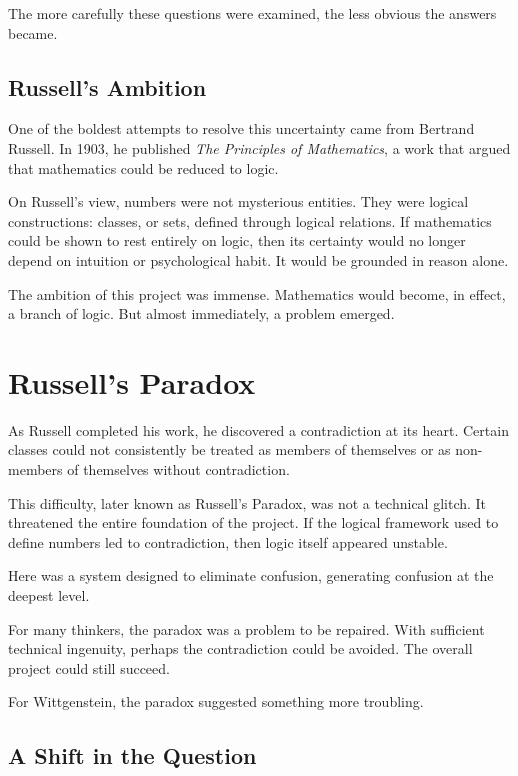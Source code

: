 \documentclass[11pt]{article}
\begin{document}
The more carefully these questions were examined, the less obvious the answers became.

\subsection*{Russell’s Ambition}

One of the boldest attempts to resolve this uncertainty came from Bertrand Russell. In 1903, he published \emph{The Principles of Mathematics}, a work that argued that mathematics could be reduced to logic.

On Russell’s view, numbers were not mysterious entities. They were logical constructions: classes, or sets, defined through logical relations. If mathematics could be shown to rest entirely on logic, then its certainty would no longer depend on intuition or psychological habit. It would be grounded in reason alone.

The ambition of this project was immense. Mathematics would become, in effect, a branch of logic. But almost immediately, a problem emerged.

\section*{Russell’s Paradox}

As Russell completed his work, he discovered a contradiction at its heart. Certain classes could not consistently be treated as members of themselves or as non-members of themselves without contradiction.

This difficulty, later known as Russell’s Paradox, was not a technical glitch. It threatened the entire foundation of the project. If the logical framework used to define numbers led to contradiction, then logic itself appeared unstable.

Here was a system designed to eliminate confusion, generating confusion at the deepest level.

For many thinkers, the paradox was a problem to be repaired. With sufficient technical ingenuity, perhaps the contradiction could be avoided. The overall project could still succeed.

For Wittgenstein, the paradox suggested something more troubling.

\subsection*{A Shift in the Question}
\end{document}
